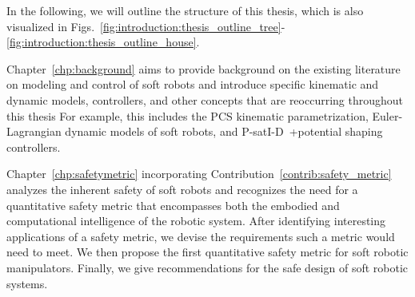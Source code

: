In the following, we will outline the structure of this thesis, which is also visualized in Figs.~\ref{fig:introduction:thesis_outline_tree}-\ref{fig:introduction:thesis_outline_house}.

Chapter~\ref{chp:background} aims to provide background on the existing literature on modeling and control of soft robots and introduce specific kinematic and dynamic models, controllers, and other concepts that are reoccurring throughout this thesis
For example, this includes the \gls{PCS} kinematic parametrization, Euler-Lagrangian dynamic models of soft robots, and P-satI-D~\citep{pustina2022p}+potential shaping~\citep{della2023model} controllers.

Chapter~\ref{chp:safetymetric} incorporating Contribution~\ref{contrib:safety_metric} analyzes the inherent safety of soft robots and recognizes the need for a quantitative safety metric that encompasses both the embodied and computational intelligence of the robotic system. After identifying interesting applications of a safety metric, we devise the requirements such a metric would need to meet. We then propose the first quantitative safety metric for soft robotic manipulators. Finally, we give recommendations for the safe design of soft robotic systems.

